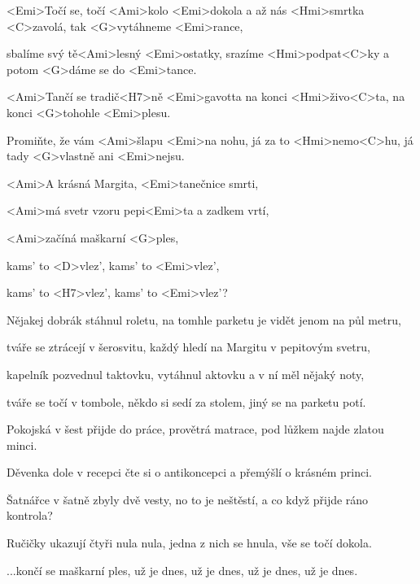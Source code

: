 

\zs
<Emi>Točí se, točí <Ami>kolo <Emi>dokola a až nás <Hmi>smrtka <C>zavolá,
tak <G>vytáhneme <Emi>rance,

sbalíme svý tě<Ami>lesný <Emi>ostatky, srazíme <Hmi>podpat<C>ky
a potom <G>dáme se do <Emi>tance.

<Ami>Tančí se tradič<H7>ně <Emi>gavotta na konci <Hmi>živo<C>ta,
na konci <G>tohohle <Emi>plesu.

Promiňte, že vám <Ami>šlapu <Emi>na nohu, já za to <Hmi>nemo<C>hu,
já tady <G>vlastně ani <Emi>nejsu.
\ks

\zr
<Ami>A krásná Margita, <Emi>tanečnice smrti,

<Ami>má svetr vzoru pepi<Emi>ta a zadkem vrtí,

<Ami>začíná maškarní <G>ples,

kams' to <D>vlez', kams' to <Emi>vlez',

kams' to <H7>vlez', kams' to <Emi>vlez'?
\kr

\zs
Nějakej dobrák stáhnul roletu, na tomhle parketu je vidět jenom na půl metru,

tváře se ztrácejí v šerosvitu, každý hledí na Margitu v pepitovým svetru,

kapelník pozvednul taktovku, vytáhnul aktovku a v ní měl nějaký noty,

tváře se točí v tombole, někdo si sedí za stolem, jiný se na parketu potí.
\ks

\zr\kr

\zs
Pokojská v šest přijde do práce, provětrá matrace, pod lůžkem najde zlatou minci.

Děvenka dole v recepci čte si o antikoncepci a přemýšlí o krásném princi.

Šatnářce v šatně zbyly dvě vesty, no to je neštěstí, a co když přijde ráno kontrola?

Ručičky ukazují čtyři nula nula, jedna z nich se hnula, vše se točí dokola.
\ks

\zr
...končí se maškarní ples, už je dnes, už je dnes, už je dnes, už je dnes.
\kr

\kp
